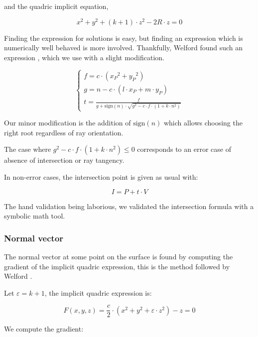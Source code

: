 and the quadric implicit equation,

\begin{equation}
x^2 + y^2 + (k+1) \cdot z^2 - 2R \cdot z = 0
\end{equation}

Finding the expression for solutions is easy, but finding an expression which
is numerically well behaved is more involved. Thankfully, Welford found such
an expression \cite{Welford:1986}, which we use with a slight modification.

\begin{equation} \begin{cases}
f = c \cdot ({x_P}^2 + {y_P}^2) \\
g = n - c \cdot (l \cdot x_P + m \cdot y_P) \\
t = \frac{f}{g + \textrm{sign}(n) \cdot
             \sqrt{g^2 - c \cdot f \cdot (1 + k \cdot n^2)}}
\end{cases} \end{equation}

Our minor modification is the addition of $\textrm{sign}(n)$ which allows
choosing the right root regardless of ray orientation.

The case where $g^2 - c \cdot f \cdot (1 + k \cdot n^2) \leq 0$ corresponds
to an error case of absence of intersection or ray tangency.

In non-error cases, the intersection point is given as usual with:

\begin{equation}
I = P + t \cdot V
\end{equation}

The hand validation being laborious, we validated the intersection formula with
a symbolic math tool.

\subsubsection{Normal vector}
The normal vector at some point on the surface is found by computing the
gradient of the implicit quadric expression, this is the method followed by
Welford \cite{Welford:1986}.

Let $\varepsilon = k+1$, the implicit quadric expression is:

\begin{equation}
F(x,y,z) = \frac{c}{2} \cdot (x^2 + y^2 + \varepsilon \cdot z^2) - z = 0
\end{equation}

We compute the gradient:

